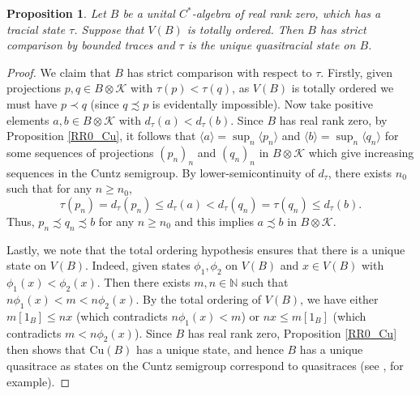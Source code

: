 \documentclass[reqno]{amsart}
\newtheorem{prop}[thm]{Proposition}
\theoremstyle{definition}
\theoremstyle{remark}
\numberwithin{equation}{section}
\theoremstyle{definition}
\newcommand{\calK}{\mathcal{K}}
\begin{document}
\begin{prop}\label{prop.codomain.strictcomp}
    Let $B$ be a unital $C^*$-algebra of real rank zero, which has a tracial state $\tau$. Suppose that $V(B)$ is totally ordered. Then $B$ has strict comparison by bounded traces and $\tau$ is the unique quasitracial state on $B$. 
\end{prop} 
\begin{proof} 
We claim that $B$ has strict comparison with respect to $\tau$. Firstly, given projections $p,q\in B\otimes \mathcal K$ with $\tau(p)<\tau(q)$, as $V(B)$ is totally ordered we must have $p\prec q$ (since $q\precsim p$ is evidentally impossible). Now take positive elements $a, b \in B\otimes \calK$ with $d_{\tau}(a) < d_{\tau}(b)$. Since $B$ has real rank zero, by Proposition \ref{RR0_Cu}, it follows that $\langle a\rangle = \sup_{n}\langle p_{n}\rangle$ and $\langle b\rangle = \sup_{n}\langle q_{n}\rangle$ for some sequences of projections $(p_{n})_{n}$ and $(q_{n})_{n}$ in $B\otimes \calK$ which give increasing sequences in the Cuntz semigroup. By lower-semicontinuity of $d_{\tau}$, there exists $n_{0}$ such that for any $n\geq n_{0}$, 
\begin{equation} 
\tau(p_n)=d_{\tau} (p_{n}) \leq d_{\tau} (a) < d_{\tau} (q_{n})=\tau(q_n) \leq d_{\tau} (b).
\end{equation} 
Thus, $p_{n}\precsim q_{n}\precsim b$ for any $n\geq n_{0}$ and this implies $a\precsim b$ in $B\otimes \calK$. 


Lastly, we note that the total ordering hypothesis ensures that there is a unique state on $V(B)$. Indeed, given states $\phi_1,\phi_2$ on $V(B)$ and $x\in V(B)$ with $\phi_1(x)<\phi_2(x)$. Then there exists $m, n\in \mathbb{N}$ such that $n\phi_{1}(x) < m < n\phi_{2}(x)$. By the total ordering of $V(B)$, we have either $m[1_B]\leq nx$ (which contradicts $n\phi_1(x)<m$) or $nx\leq m[1_B]$ (which contradicts $m<n\phi_2(x)$). Since $B$ has real rank zero, Proposition \ref{RR0_Cu} then shows that $\mathrm{Cu}(B)$ has a unique state, and hence $B$ has a unique quasitrace as states on the Cuntz semigroup correspond to quasitraces (see \cite[Theorem 6.9]{modern-cuntz}, for example).  
\end{proof}
\end{document}
